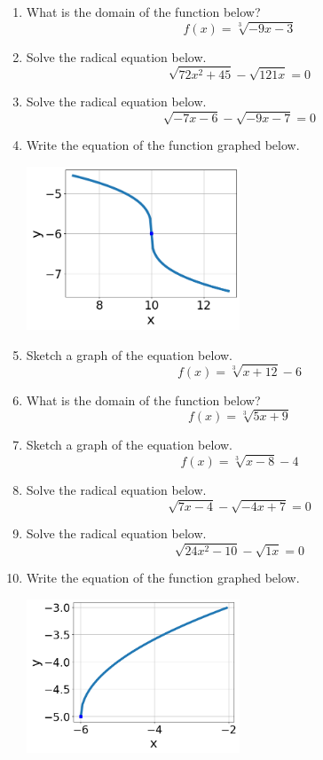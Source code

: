 \documentclass[14pt]{extbook}
\begin{document}
\begin{enumerate}
\item{
What is the domain of the function below?\[ f(x) = \sqrt[3]{-9 x - 3} \]} \newpage
\item{
Solve the radical equation below.\[ \sqrt{72 x^2 + 45} - \sqrt{121 x} = 0 \]} \newpage
\item{
Solve the radical equation below.\[ \sqrt{-7 x - 6} - \sqrt{-9 x - 7} = 0 \]} \newpage
\item{
Write the equation of the function graphed below.
\begin{center}
    \includegraphics[width=0.5\textwidth]{../Figures/radicalGraphToEquationB.png}
\end{center}
} \newpage
\item{
Sketch a graph of the equation below.\[ f(x) = \sqrt[3]{x + 12} - 6 \]} \newpage
\item{
What is the domain of the function below?\[ f(x) = \sqrt[3]{5 x + 9} \]} \newpage
\item{
Sketch a graph of the equation below.\[ f(x) = \sqrt[3]{x - 8} - 4 \]} \newpage
\item{
Solve the radical equation below.\[ \sqrt{7 x - 4} - \sqrt{-4 x + 7} = 0 \]} \newpage
\item{
Solve the radical equation below.\[ \sqrt{24 x^2 - 10} - \sqrt{1 x} = 0 \]} \newpage
\item{
Write the equation of the function graphed below.
\begin{center}
    \includegraphics[width=0.5\textwidth]{../Figures/radicalGraphToEquationCopyB.png}
\end{center}
} \newpage
\end{enumerate}
\end{document}
